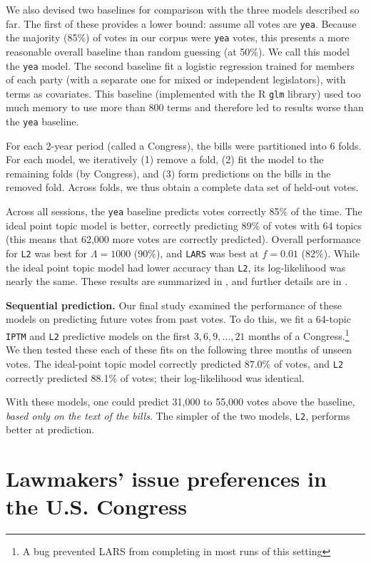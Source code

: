 We also devised two baselines for comparison with the three models
described so far.  The first of these provides a lower bound: assume
all votes are \verb!yea!.  Because the majority (85\%) of votes in our
corpus were \verb!yea! votes, this presents a more reasonable overall
baseline than random guessing (at 50\%).  We call this model the
\verb!yea!  model.  The second baseline fit a logistic regression
trained for members of each party (with a separate one for mixed or
independent legislators), with terms as covariates.  This baseline
(implemented with the R \verb!glm! library) used too much memory to
use more than 800 terms and therefore led to results worse than the
\verb!yea!  baseline.

For each 2-year period (called a Congress), the bills were partitioned
into 6 folds.  For each model, we iteratively (1) remove a fold, (2)
fit the model to the remaining folds (by Congress), and (3) form
predictions on the bills in the removed fold.  Across folds, we thus
obtain a complete data set of held-out votes.

Across all sessions, the \verb!yea! baseline predicts votes correctly
85\% of the time.  The ideal point topic model is better, correctly
predicting 89\% of votes with 64 topics (this means that 62,000 more
votes are correctly predicted).  Overall performance for \verb!L2! was
best for $\Lambda=1000$ (90\%), and \verb!LARS! was best at $f=0.01$
(82\%).  While the ideal point topic model had lower accuracy than
\verb!L2!, its log-likelihood was nearly the same.  These results are
summarized in , and further details are in
.

\textbf{Sequential prediction.}  Our final study examined the
performance of these models on predicting future votes from past
votes.  To do this, we fit a 64-topic \verb!IPTM! and \verb!L2!
predictive models on the first $3, 6, 9, \ldots, 21$ months of a
Congress.\footnote{A bug prevented LARS from completing in most runs of
this setting}  We then tested these each of these fits on the
following three months of unseen votes.  The ideal-point topic model
correctly predicted $87.0\%$ of votes, and \verb!L2!  correctly
predicted 88.1\% of votes; their log-likelihood was identical.

With these models, one could predict 31,000 to 55,000 votes
above the baseline, \emph{based only on the text of the bills}.  The
simpler of the two models, \verb!L2!, performs better at prediction.

\section{Lawmakers' issue preferences in the U.S. Congress}

